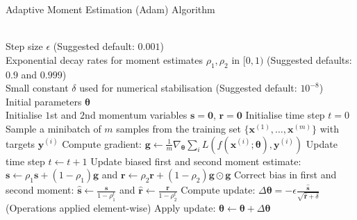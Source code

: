 \begin{breakablealgorithm}
\caption{Adaptive Moment Estimation (Adam) Algorithm}
\begin{algorithmic}
\Require \\
Step size $\epsilon$ (Suggested default: $0.001$)\\
Exponential decay rates for moment estimates $\rho_1, \rho_2$ in $[0,1)$ (Suggested defaults: $0.9$ and $0.999$)\\
Small constant $\delta$ used for numerical stabilisation (Suggested default: $10^{-8}$)\\
Initial parameters $\bm{\theta}$\\

\State Initialise $1$st and $2$nd momentum variables $\bm{s} = \bm{0}$, $\bm{r} = \bm{0}$
\State Initialise time step $t=0$
\State Sample a minibatch of $m$ samples from the training set $\{\bm{x}^{(1)}, \ldots, \bm{x}^{(m)} \}$ with targets $\bm{y}^{(i)}$
\State Compute gradient: $\bm{g} \leftarrow \frac{1}{m} \nabla_{\bm{\theta}} \sum_i L(f(\bm{x}^{(i)}; \bm{\theta}), \bm{y}^{(i)})$
\State Update time step $t \leftarrow t+1$
\State Update biased first and second moment estimate: $\bm{s} \leftarrow \rho_1 \bm{s} + (1-\rho_1) \bm{g}$ and $\bm{r} \leftarrow \rho_2 \bm{r} + (1-\rho_2) \bm{g} \odot \bm{g}$
\State Correct bias in first and second moment: $\hat{\bm{s}} \leftarrow \frac{\bm{s}}{1 - \rho_1^t}$ and $\hat{\bm{r}} \leftarrow \frac{\bm{r}}{1 - \rho_2^t}$
\State Compute update: $\Delta \bm{\theta} = - \epsilon \frac{\hat{\bm{s}}}{\sqrt{\hat{\bm{r}} + \delta}}$ (Operations applied element-wise)
\State Apply update: $\bm{\theta} \leftarrow \bm{\theta} + \Delta \bm{\theta}$
\EndWhile
\end{algorithmic}
\end{breakablealgorithm}


